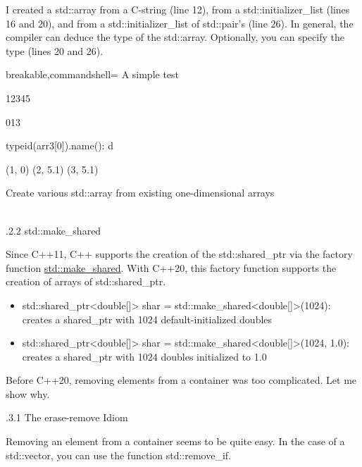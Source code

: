 I created a std::array from a C-string (line 12), from a std::initializer\_list (lines 16 and 20), and from a std::initializer\_list of std::pair’s (line 26). In general, the compiler can deduce the type of the std::array. Optionally, you can specify the type (lines 20 and 26).

\begin{tcblisting}{breakable,commandshell={}}
A simple test

12345

013

typeid(arr3[0]).name(): d

(1, 0)
(2, 5.1)
(3, 5.1)
\end{tcblisting}

\begin{center}
Create various std::array from existing one-dimensional arrays
\end{center}

\hspace*{\fill} \\ %
.2.2\hspace{0.2cm} std::make\_shared

Since C++11, C++ supports the creation of the std::shared\_ptr via the factory function \href{https://en.cppreference.com/w/cpp/memory/shared_ptr/make_shared}{std::make\_shared}. With C++20, this factory function supports the creation of arrays of std::shared\_ptr.

\begin{itemize}
\item 
std::shared\_ptr<double[]> shar = std::make\_shared<double[]>(1024): creates a shared\_ptr with 1024 default-initialized doubles

\item 
std::shared\_ptr<double[]> shar = std::make\_shared<double[]>(1024, 1.0): creates a shared\_ptr with 1024 doubles initialized to 1.0
\end{itemize}


Before C++20, removing elements from a container was too complicated. Let me show why.

.3.1\hspace{0.2cm} The erase-remove Idiom

Removing an element from a container seems to be quite easy. In the case of a std::vector, you can use the function std::remove\_if.

